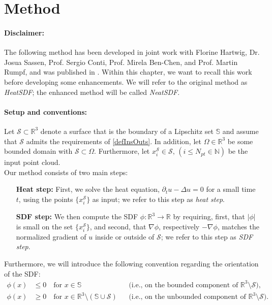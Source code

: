 \documentclass[12pt,openany]{book}
\newcommand{\R}{\mathbb{R}}
\def\S{\mathcal{S}}
\theoremstyle{plainnormal}
\theoremstyle{remark}
\begin{document}
\section{Method}\label{section_SDFmethod}
\paragraph{Disclaimer:} The following method has been developed in joint work with Florine Hartwig, Dr. Josua Sassen, Prof. Sergio Conti, Prof. Mirela Ben-Chen, and Prof. Martin Rumpf, and was published in \cite{weidemaier2025sdfsunorientedpointclouds}. Within this chapter, we want to recall this work before developing some enhancements. We will refer to the original method as \emph{HeatSDF}; the enhanced method will be called \emph{NeatSDF}.
\paragraph{Setup and conventions:}
Let \(\mathcal{S} \subset \mathbb{R}^3\) denote a surface that is the boundary of a Lipschitz set \(\mathbb{S} \) and assume that $\S$ admits the requirements of \cref{defInsOuts}. In addition, let $\Omega \in \R^3$ be some bounded domain with $\S \subset \Omega$.
Furthermore, let $x^\S_i\in \mathcal{S}, \, (i \leq N_{pt}\in \mathbb N)$ be the input point cloud.\\
Our method consists of two main steps:
\begin{enumerate}[align=left]
\item[\textbf{Heat step:}]First, we solve the heat equation, $\partial_t u - \Delta u = 0$ for a small time $t$, using the points $\{x^\S_i\}$ as input; we refer to this step as \emph{heat step}.
\item[\textbf{SDF step:}]We then compute the SDF $\phi: \mathbb{R}^3\rightarrow\R$ by requiring, first, that $|\phi|$ is small on the set $\{x_i^\mathcal{S}\}$, and second, that $\nabla \phi$, respectively $-\nabla \phi$, matches the normalized gradient of $u$ inside or outside of $\mathcal{S}$; we refer to this step as \emph{SDF step}.
\end{enumerate}

Furthermore, we will introduce the following convention regarding the orientation of the SDF:
\begin{align*}
\phi(x) &\leq 0 \quad \text{for } x \in \mathbb S \, \,\, &&\text{(i.e., on the bounded component of }\R^3\setminus\mathcal{S}), \\ \phi(x) &\geq 0 \quad \text{for } x \in \mathbb{R}^3 \setminus (\mathbb{S} \cup \mathcal S)  &&\text{(i.e., on the unbounded component of }\R^3\setminus\mathcal{S}).   
\end{align*}
\end{document}
